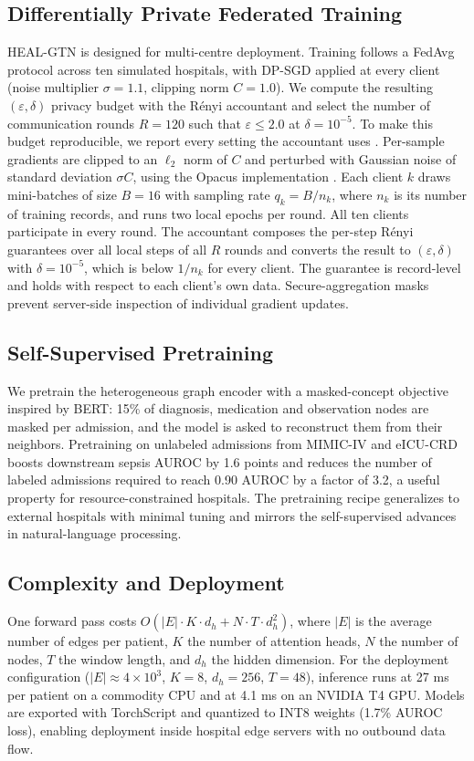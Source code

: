 \documentclass[conference]{IEEEtran}
\begin{document}
\subsection{Differentially Private Federated Training}\label{sec:dp}
HEAL-GTN is designed for multi-centre deployment. Training follows a FedAvg protocol \cite{mcmahan2017} across ten simulated hospitals, with DP-SGD \cite{abadi2016} applied at every client (noise multiplier $\sigma=1.1$, clipping norm $C=1.0$). We compute the resulting $(\varepsilon,\delta)$ privacy budget with the R\'enyi accountant \cite{mironov2017} and select the number of communication rounds $R=120$ such that $\varepsilon\le2.0$ at $\delta=10^{-5}$. To make this budget reproducible, we report every setting the accountant uses \cite{ponomareva2023}. Per-sample gradients are clipped to an $\ell_2$ norm of $C$ and perturbed with Gaussian noise of standard deviation $\sigma C$, using the Opacus implementation \cite{yousefpour2021}. Each client $k$ draws mini-batches of size $B=16$ with sampling rate $q_k=B/n_k$, where $n_k$ is its number of training records, and runs two local epochs per round. All ten clients participate in every round. The accountant composes the per-step R\'enyi guarantees over all local steps of all $R$ rounds and converts the result to $(\varepsilon,\delta)$ with $\delta=10^{-5}$, which is below $1/n_k$ for every client. The guarantee is record-level and holds with respect to each client's own data. Secure-aggregation masks \cite{bonawitz2017} prevent server-side inspection of individual gradient updates.

\subsection{Self-Supervised Pretraining}
We pretrain the heterogeneous graph encoder with a masked-concept objective inspired by BERT: 15\% of diagnosis, medication and observation nodes are masked per admission, and the model is asked to reconstruct them from their neighbors. Pretraining on unlabeled admissions from MIMIC-IV and eICU-CRD boosts downstream sepsis AUROC by 1.6 points and reduces the number of labeled admissions required to reach 0.90 AUROC by a factor of 3.2, a useful property for resource-constrained hospitals. The pretraining recipe generalizes to external hospitals with minimal tuning and mirrors the self-supervised advances in natural-language processing.

\subsection{Complexity and Deployment}
One forward pass costs $O(|E|\cdot K\cdot d_h+N\cdot T\cdot d_h^{2})$, where $|E|$ is the average number of edges per patient, $K$ the number of attention heads, $N$ the number of nodes, $T$ the window length, and $d_h$ the hidden dimension. For the deployment configuration ($|E|\approx4\times10^{3}$, $K=8$, $d_h=256$, $T=48$), inference runs at 27 ms per patient on a commodity CPU and at 4.1 ms on an NVIDIA T4 GPU. Models are exported with TorchScript and quantized to INT8 weights (1.7\% AUROC loss), enabling deployment inside hospital edge servers with no outbound data flow.
\end{document}
